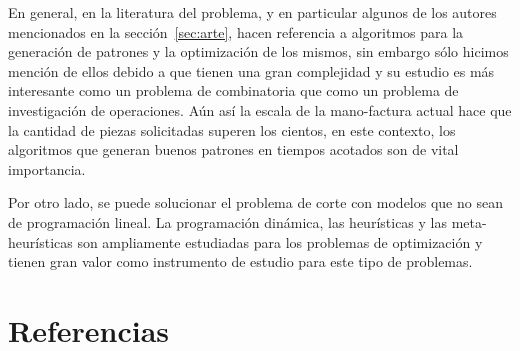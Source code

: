 \documentclass[journal, 10pt]{IEEEtran}
\begin{document}
	En general, en la literatura del problema, y en particular algunos de los
	autores mencionados en la sección~\ref{sec:arte}, hacen referencia a
	algoritmos para la generación de patrones y la optimización de los mismos,
	sin embargo sólo hicimos mención de ellos debido a que tienen una gran 
	complejidad y su estudio es más interesante como un problema de 
	combinatoria que como un problema de investigación de operaciones. Aún así
	la escala de la mano-factura actual hace que la cantidad de piezas 
	solicitadas superen los cientos, en este contexto, los algoritmos que 
	generan buenos patrones en tiempos acotados son de vital importancia.
	
	Por otro lado, se puede solucionar el problema de corte con modelos que no 
	sean de programación lineal. La programación dinámica, las heurísticas y las
	meta-heurísticas son ampliamente estudiadas para los problemas de 
	optimización y tienen gran valor como instrumento de estudio para este
	tipo de problemas.

\section{Referencias}

\renewcommand{\section}[2]{}%

\end{document}
